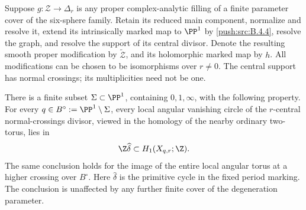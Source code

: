 \begin{proposition}\hypertarget{tag-0311}{}\label{push:src:B.4.31}

Suppose $g:\mathcal Z\to\Delta_r$ is any proper complex-analytic
filling of a finite parameter cover of the six-sphere
family. Retain its reduced main component, normalize and resolve
it, extend its intrinsically marked map to $\PP^1$ by \ref{push:src:B.4.4},
resolve the graph, and resolve the support of its central divisor. Denote
the resulting smooth proper modification by $\widetilde{\mathcal Z}$,
and its holomorphic marked map by $h$. All modifications can be
chosen to be isomorphisms over $r\ne0$. The central support has
normal crossings; its multiplicities need not be one.

There is a finite subset $\Sigma\subset\PP^1$, containing
$0,1,\infty$, with the following property. For every
$q\in B^\circ:=\PP^1\setminus\Sigma$, every local angular
vanishing circle of the $r$-central normal-crossings divisor,
viewed in the homology of the nearby ordinary two-torus, lies in
\begin{equation}
             \Z\widehat\delta\subset H_1(X_{q,r};\Z).
\label{pub:I:eq:B-4-31-1}
\end{equation}
The same conclusion holds for the image of the entire local
angular torus at a higher crossing over $B^\circ$.
Here $\widehat\delta$ is the primitive cycle in the fixed
period marking. The conclusion is unaffected by any further
finite cover of the degeneration parameter.


\end{proposition}


